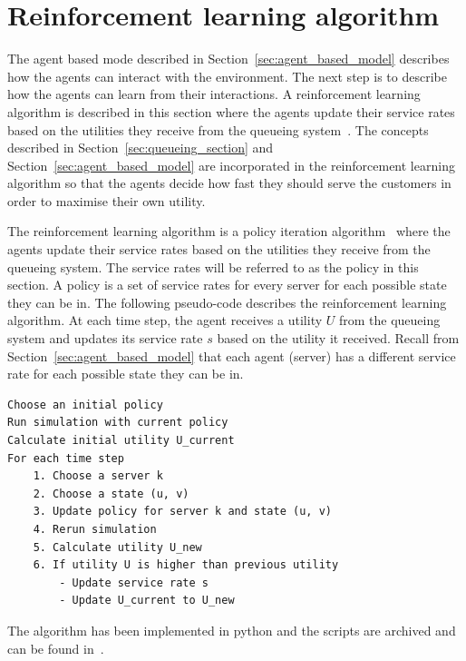 \section{Reinforcement learning algorithm}\label{sec:reinforcement_learning}

The agent based mode described in Section~\ref{sec:agent_based_model} describes
how the agents can interact with the environment.
The next step is to describe how the agents can learn from their interactions.
A reinforcement learning algorithm is described in this section where the agents
update their service rates based on the utilities they receive from the
queueing system~\cite{kaelbling1996, liu2019, ayesta2022}.
The concepts described in Section~\ref{sec:queueing_section} and
Section~\ref{sec:agent_based_model} are incorporated in the reinforcement
learning algorithm so that the agents decide how fast they should serve the
customers in order to maximise their own utility.

The reinforcement learning algorithm is a policy iteration
algorithm~\cite{mahadevan1996average} where the agents update their service
rates based on the utilities they receive from the queueing system.
The service rates will be referred to as the policy in this section.
A policy is a set of service rates for every server for each possible state
they can be in.
The following pseudo-code describes the reinforcement learning algorithm.
At each time step, the agent receives a utility $U$ from the queueing system
and updates its service rate $s$ based on the utility it received.
Recall from Section~\ref{sec:agent_based_model} that each agent (server) has
a different service rate for each possible state they can be in.

\vspace*{0.5cm}

\begin{lstlisting}
Choose an initial policy
Run simulation with current policy
Calculate initial utility U_current
For each time step
    1. Choose a server k
    2. Choose a state (u, v)
    3. Update policy for server k and state (u, v)
    4. Rerun simulation
    5. Calculate utility U_new
    6. If utility U is higher than previous utility
        - Update service rate s
        - Update U_current to U_new

\end{lstlisting}

The algorithm has been implemented in python and the scripts are archived and
can be found in~\cite{michalis_panayides_2023_7586860}.

